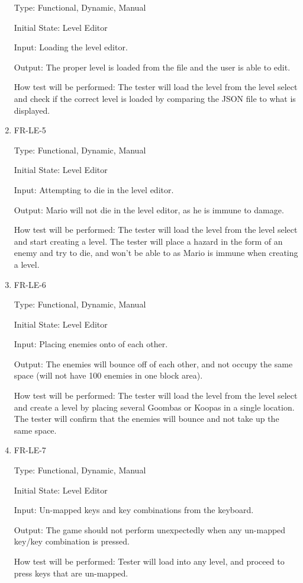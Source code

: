 \documentclass[12pt, titlepage]{article}
\begin{document}
\begin{enumerate}
Type: Functional, Dynamic, Manual

Initial State: Level Editor

Input: Loading the level editor.

Output: The proper level is loaded from the file and the user is able to edit.

How test will be performed: The tester will load the level from the level select and check if the correct level is loaded by comparing the JSON file to what is displayed.

\color{red}

\item{FR-LE-5}

Type: Functional, Dynamic, Manual

Initial State: Level Editor

Input: Attempting to die in the level editor.

Output: Mario will not die in the level editor, as he is immune to damage.

How test will be performed: The tester will load the level from the level select and start creating a level. The tester will place a hazard in the form of an enemy and try to die, and won't be able to as Mario is immune when creating a level.

\item{FR-LE-6}

Type: Functional, Dynamic, Manual

Initial State: Level Editor

Input: Placing enemies onto of each other.

Output: The enemies will bounce off of each other, and not occupy the same space (will not have 100 enemies in one block area).

How test will be performed: The tester will load the level from the level select and create a level by placing several Goombas or Koopas in a single location. The tester will confirm that the enemies will bounce and not take up the same space.

\item{FR-LE-7}

Type: Functional, Dynamic, Manual

Initial State: Level Editor

Input: Un-mapped keys and key combinations from the keyboard.

Output: The game should not perform unexpectedly when any un-mapped key/key combination is pressed.

How test will be performed: Tester will load into any level, and proceed to press keys that are un-mapped.

\color{Black}

\end{enumerate}
\end{document}

